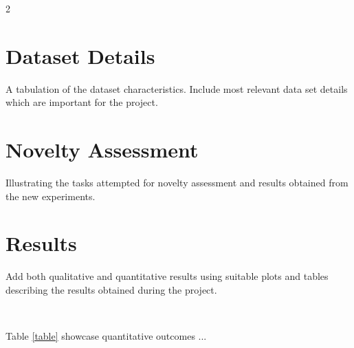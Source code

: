 \documentclass[a0,portrait]{a0poster}
\begin{document}
\begin{minipage}[c]{\linewidth}
\begin{framed}
\begin{multicols}{2}

\color{Black}
\section*{Dataset Details}
A tabulation of the dataset characteristics. Include most relevant data set details which are important for the project.

\color{Black}
\section*{Novelty Assessment}
Illustrating the tasks attempted for novelty assessment and results obtained from the new experiments. 



\color{Black}
\section*{Results}
Add both qualitative and quantitative results using suitable plots and tables describing the results obtained during the project. 

\begin{center}
	\\
	\vspace{-0.25in}
\end{center}
\vspace{0.25in}
Table \ref{table} showcase quantitative outcomes ...


\end{multicols}
\end{framed}
\end{minipage}
\end{document}
